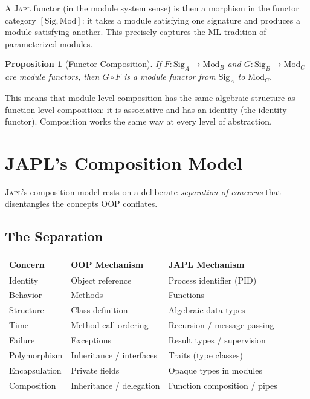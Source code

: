 \documentclass[11pt,a4paper]{article}
\newtheorem{proposition}[theorem]{Proposition}
\newcommand{\japl}{\textsc{Japl}}
\newcommand{\Sig}{\mathrm{Sig}}
\newcommand{\Mod}{\mathrm{Mod}}
\begin{document}
A \japl{} functor (in the module system sense) is then a morphism in the functor category $[\Sig, \Mod]$: it takes a module satisfying one signature and produces a module satisfying another. This precisely captures the ML tradition of parameterized modules.

\begin{proposition}[Functor Composition]
\label{prop:functor-composition}
If $F : \Sig_A \to \Mod_B$ and $G : \Sig_B \to \Mod_C$ are module functors, then $G \circ F$ is a module functor from $\Sig_A$ to $\Mod_C$.
\end{proposition}

This means that module-level composition has the same algebraic structure as function-level composition: it is associative and has an identity (the identity functor). Composition works the same way at every level of abstraction.


\section{JAPL's Composition Model}
\label{sec:japl-composition}

\japl{}'s composition model rests on a deliberate \emph{separation of concerns} that disentangles the concepts OOP conflates.

\subsection{The Separation}

\begin{center}
\begin{tabular}{lll}
\toprule
\textbf{Concern} & \textbf{OOP Mechanism} & \textbf{JAPL Mechanism} \\
\midrule
Identity & Object reference & Process identifier (PID) \\
Behavior & Methods & Functions \\
Structure & Class definition & Algebraic data types \\
Time & Method call ordering & Recursion / message passing \\
Failure & Exceptions & Result types / supervision \\
Polymorphism & Inheritance / interfaces & Traits (type classes) \\
Encapsulation & Private fields & Opaque types in modules \\
Composition & Inheritance / delegation & Function composition / pipes \\
\bottomrule
\end{tabular}
\end{center}
\end{document}
